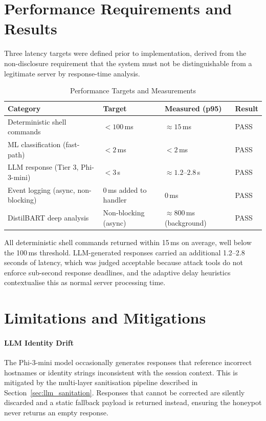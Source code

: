 \section{Performance Requirements and Results}

Three latency targets were defined prior to implementation, derived from the non-disclosure requirement that the system must not be distinguishable from a legitimate server by response-time analysis.

\begin{table}[h!]
    \centering
    \caption{Performance Targets and Measurements}
    \renewcommand{\arraystretch}{1.3}
    \begin{tabular}{|l|l|l|l|}
        \hline
        \textbf{Category} & \textbf{Target} & \textbf{Measured (p95)} & \textbf{Result} \\
        \hline
        Deterministic shell commands & $<100$\,ms & $\approx 15$\,ms & PASS \\
        ML classification (fast-path) & $<2$\,ms & $<2$\,ms & PASS \\
        LLM response (Tier 3, Phi-3-mini) & $<3$\,s & $\approx 1.2$–$2.8$\,s & PASS \\
        Event logging (async, non-blocking) & 0\,ms added to handler & 0\,ms & PASS \\
        DistilBART deep analysis & Non-blocking (async) & $\approx 800$\,ms (background) & PASS \\
        \hline
    \end{tabular}
\end{table}

All deterministic shell commands returned within 15\,ms on average, well below the 100\,ms threshold. LLM-generated responses carried an additional 1.2–2.8 seconds of latency, which was judged acceptable because attack tools do not enforce sub-second response deadlines, and the adaptive delay heuristics contextualise this as normal server processing time.

\section{Limitations and Mitigations}

\paragraph{LLM Identity Drift}
The Phi-3-mini model occasionally generates responses that reference incorrect hostnames or identity strings inconsistent with the session context. This is mitigated by the multi-layer sanitisation pipeline described in Section~\ref{sec:llm_sanitation}. Responses that cannot be corrected are silently discarded and a static fallback payload is returned instead, ensuring the honeypot never returns an empty response.


